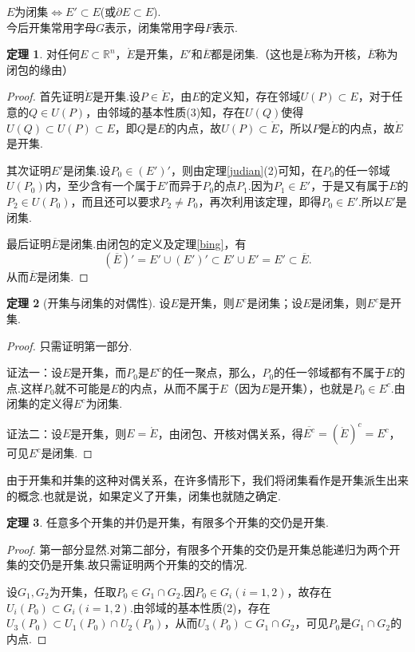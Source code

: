 \documentclass[lang=cn,12pt]{ctexart}
\theoremstyle{definition}
\newtheorem{theorem}{定理}
\theoremstyle{plain}
\begin{document}
$E$为闭集$\iff E'\subset E$(或$\partial E\subset E$).\\
今后开集常用字母$G$表示，闭集常用字母$F$表示.
\begin{theorem}
	对任何$E\subset\mathbb{R}^n$，$\mathring{E}$是开集，$E'$和$\overline{E}$都是闭集.（这也是$\mathring{E}$称为开核，$\overline{E}$称为闭包的缘由）
\end{theorem}
\begin{proof}
	首先证明$\mathring{E}$是开集.设$P\in\mathring{E}$，由$E$的定义知，存在邻域$U(P)\subset E$，对于任意的$Q\in U(P)$，由邻域的基本性质(3)知，存在$U(Q)$使得$U(Q)\subset U(P)\subset E$，即$Q$是$E$的内点，故$U(P)\subset\mathring{E}$，所以$P$是$\mathring{E}$的内点，故$\mathring{E}$是开集.
	
	其次证明$E'$是闭集.设$P_0\in(E')'$，则由定理\ref{judian}(2)可知，在$P_0$的任一邻域$U(P_0)$内，至少含有一个属于$E'$而异于$P_0$的点$P_1$.因为$P_1\in E'$，于是又有属于$E$的$P_2\in U(P_0)$，而且还可以要求$P_2\neq P_0$，再次利用该定理，即得$P_0\in E'$.所以$E'$是闭集.
	
	最后证明$\overline{E}$是闭集.由闭包的定义及定理\ref{bing}，有
	$$(\overline{E})'=E'\cup(E')'\subset E'\cup E'=E'\subset\overline{E}.$$
	从而$\overline{E}$是闭集.
\end{proof}
\begin{theorem}[开集与闭集的对偶性]
	设$E$是开集，则$E^c$是闭集；设$E$是闭集，则$E^c$是开集.
\end{theorem}
\begin{proof}
	只需证明第一部分.
	
	证法一：设$E$是开集，而$P_0$是$E^c$的任一聚点，那么，$P_0$的任一邻域都有不属于$E$的点.这样$P_0$就不可能是$E$的内点，从而不属于$E$（因为$E$是开集），也就是$P_0\in E^c$.由闭集的定义得$E^c$为闭集.
	
	证法二：设$E$是开集，则$E=\mathring{E}$，由闭包、开核对偶关系，得$\overline{E^c}=(\mathring{E})^c=E^c$，可见$E^c$是闭集.
\end{proof}
由于开集和并集的这种对偶关系，在许多情形下，我们将闭集看作是开集派生出来的概念.也就是说，如果定义了开集，闭集也就随之确定.
\begin{theorem}\label{kai}
	任意多个开集的并仍是开集，有限多个开集的交仍是开集.
\end{theorem}
\begin{proof}
	第一部分显然.对第二部分，有限多个开集的交仍是开集总能递归为两个开集的交仍是开集.故只需证明两个开集的交的情况.
	
	设$G_1,G_2$为开集，任取$P_0\in G_1\cap G_2$.因$P_0\in G_i(i=1,2)$，故存在$U_i(P_0)\subset G_i(i=1,2)$.由邻域的基本性质(2)，存在$U_3(P_0)\subset U_1(P_0)\cap U_2(P_0)$，从而$U_3(P_0)\subset G_1\cap G_2$，可见$P_0$是$G_1\cap G_2$的内点.
\end{proof}
\end{document}
